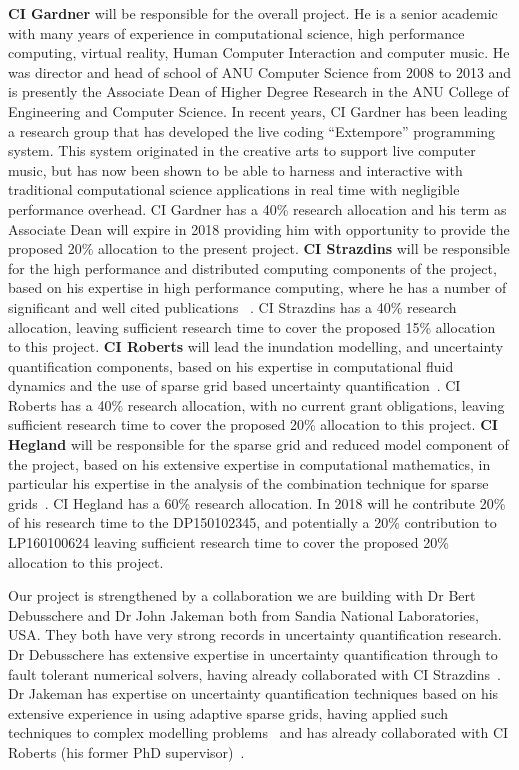 {\bf CI Gardner} will be responsible for the overall project. He is a senior
academic with many years of experience in computational science, high
performance computing, virtual reality, Human Computer Interaction and
computer music. He was director and head of school of ANU Computer
Science from 2008 to 2013 and is presently the Associate Dean of
Higher Degree Research in the ANU College of Engineering and Computer
Science. In recent years, CI Gardner has been leading a research group
that has developed the live coding ``Extempore'' programming
system. This system originated in the creative arts to support live
computer music, but has now been shown to be able to harness and
interactive with traditional computational science applications in
real time with negligible performance overhead. CI Gardner has a 40\%
research allocation and his term as Associate Dean will expire in 2018
providing him with opportunity to provide the proposed 20\% allocation
to the present project.
%
{\bf CI Strazdins} will be responsible for the high performance and
distributed computing components of the project, based on his
expertise in high performance computing, where he has a number of
significant and well cited publications
~\parencite{AliEtal2015,sgctalg15,Ali11022016}.  CI Strazdins
has a 40\% research allocation, leaving sufficient research time to
cover the proposed 15\% allocation to this project.
%
{\bf CI Roberts} will lead the inundation modelling, and uncertainty
quantification components, based on his expertise in computational
fluid dynamics and the use of sparse grid based uncertainty
quantification~\parencite{deBaarRDM2015,JakemanRoberts2013,anugamanual,nielsen2005hydrodynamic}.
CI Roberts has a 40\% research allocation, with no current grant
obligations, leaving sufficient research time to cover the proposed
20\% allocation to this project.
%
{\bf CI Hegland} will be responsible for the sparse grid and reduced
model component of the project, based on his extensive expertise in
computational mathematics, in particular his expertise in the analysis
of the combination technique for sparse
grids~\parencite{AliEtal2015,HardingHLS2015,Ali11022016}.  CI Hegland
has a 60\% research allocation. In 2018 will he contribute 20\% of his
research time to the DP150102345, and potentially a 20\% contribution
to LP160100624 leaving sufficient research time to cover the proposed
20\% allocation to this project.


Our project is strengthened by a collaboration we are building with Dr
Bert Debusschere and Dr John Jakeman both from Sandia National
Laboratories, USA. They both have very strong records in uncertainty
quantification research.  Dr Debusschere
has extensive expertise in uncertainty quantification through to fault
tolerant numerical solvers, having already collaborated with CI
Strazdins~\parencite{parSGCT16}.  
Dr Jakeman has expertise on uncertainty
quantification techniques based on his extensive experience in using
adaptive sparse grids, having applied such techniques to complex
modelling problems~\parencite{JakemanRoberts2013,jakemanNumerical2010,
  Jakeman2015} and has already collaborated with CI Roberts (his
former PhD supervisor)~\parencite{JakemanRoberts2013}.  

